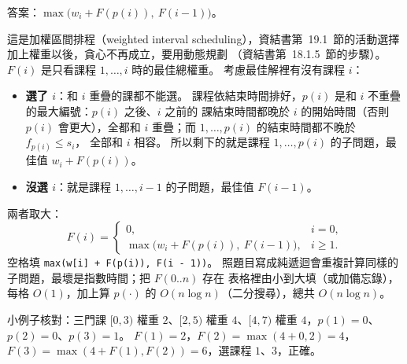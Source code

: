 \begin{pastsoln}
答案：$\max\bigl(w_i + F(p(i)),\ F(i - 1)\bigr)$。

這是加權區間排程（weighted interval scheduling），資結書第~19.1~節的活動選擇加上權重以後，貪心不再成立，要用動態規劃
（資結書第~18.1.5~節的步驟）。 $F(i)$ 是只看課程 $1, \ldots, i$ 時的最佳總權重。 考慮最佳解裡有沒有課程 $i$：
\begin{itemize}
\item \textbf{選了 $i$}：和 $i$ 重疊的課都不能選。 課程依結束時間排好，$p(i)$ 是和 $i$ 不重疊的最大編號：$p(i)$ 之後、$i$ 之前的
課結束時間都晚於 $i$ 的開始時間（否則 $p(i)$ 會更大），全都和 $i$ 重疊；而 $1, \ldots, p(i)$ 的結束時間都不晚於 $f_{p(i)} \le s_i$，
全部和 $i$ 相容。 所以剩下的就是課程 $1, \ldots, p(i)$ 的子問題，最佳值 $w_i + F(p(i))$。
\item \textbf{沒選 $i$}：就是課程 $1, \ldots, i - 1$ 的子問題，最佳值 $F(i - 1)$。
\end{itemize}
兩者取大：
\[
F(i) = \begin{cases} 0, & i = 0, \\ \max\bigl(w_i + F(p(i)),\ F(i - 1)\bigr), & i \ge 1. \end{cases}
\]
空格填 \texttt{max(w[i] + F(p(i)), F(i - 1))}。 照題目寫成純遞迴會重複計算同樣的子問題，最壞是指數時間；把 $F(0..n)$ 存在
表格裡由小到大填（或加備忘錄），每格 $O(1)$，加上算 $p(\cdot)$ 的 $O(n \log n)$（二分搜尋），總共 $O(n \log n)$。

小例子核對：三門課 $[0, 3)$ 權重 $2$、$[2, 5)$ 權重 $4$、$[4, 7)$ 權重 $4$，$p(1) = 0$、$p(2) = 0$、$p(3) = 1$。
$F(1) = 2$，$F(2) = \max(4 + 0, 2) = 4$，$F(3) = \max(4 + F(1), F(2)) = 6$，選課程 $1$、$3$，正確。
\end{pastsoln}

